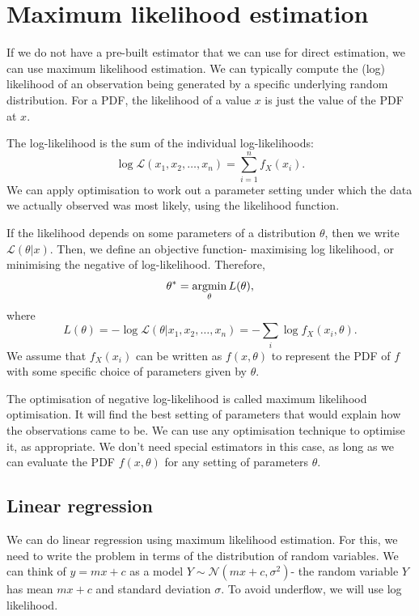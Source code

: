 \documentclass[a4paper, openany]{memoir}
\begin{document}
\section{Maximum likelihood estimation}
If we do not have a pre-built estimator that we can use for direct estimation, we can use maximum likelihood estimation. We can typically compute the (log) likelihood of an observation being generated by a specific underlying random distribution. For a PDF, the likelihood of a value $x$ is just the value of the PDF at $x$.

The log-likelihood is the sum of the individual log-likelihoods:
\[\log \mathcal{L}(x_1, x_2, \dots, x_n) = \sum_{i=1}^n f_X(x_i).\]
We can apply optimisation to work out a parameter setting under which the data we actually observed was most likely, using the likelihood function.

If the likelihood depends on some parameters of a distribution $\theta$, then we write $\mathcal{L}(\theta|x)$. Then, we define an objective function- maximising log likelihood, or minimising the negative of log-likelihood. Therefore,
\[\theta^* = \operatornamewithlimits{arg min}_\theta L(\theta),\]
where
\[L(\theta) = -\log \mathcal{L}(\theta | x_1, x_2, \dots, x_n) = -\sum_i \log f_X(x_i, \theta).\]
We assume that $f_X(x_i)$ can be written as $f(x, \theta)$ to represent the PDF of $f$ with some specific choice of parameters given by $\theta$.

The optimisation of negative log-likelihood is called maximum likelihood optimisation. It will find the best setting of parameters that would explain how the observations came to be. We can use any optimisation technique to optimise it, as appropriate. We don't need special estimators in this case, as long as we can evaluate the PDF $f(x, \theta)$ for any setting of parameters $\theta$.

\subsection{Linear regression}
We can do linear regression using maximum likelihood estimation. For this, we need to write the problem in terms of the distribution of random variables. We can think of $y = mx + c$ as a model $Y \sim \mathcal{N}(mx + c, \sigma^2)$- the random variable $Y$ has mean $mx + c$ and standard deviation $\sigma$. To avoid underflow, we will use log likelihood.
\end{document}
